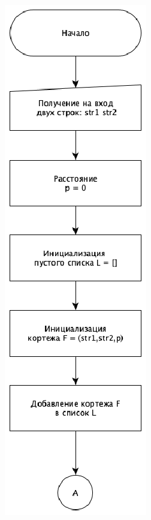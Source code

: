 \documentclass[12pt]{report}
\begin{document}
   \begin{figure}[h!]
   	\centering
   	\begin{minipage}[h!]{0.49\linewidth}
   		\includegraphics[width=0.5\linewidth]{LevenR}
   	\end{minipage}
   \begin{minipage}[h!]{0.49\linewidth}

\end{minipage}
\end{figure}
\end{document}
